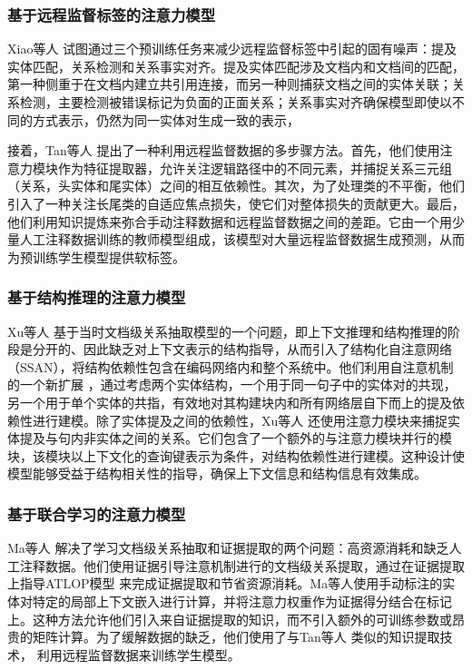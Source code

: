 \documentclass[bachelor]{thesis-uestc}
\begin{document}
\subsubsection{基于远程监督标签的注意力模型}

Xiao等人 \cite{xiao-etal-2020-denoising} 试图通过三个预训练任务来减少远程监督标签中引起的固有噪声：提及实体匹配，关系检测和关系事实对齐。提及实体匹配涉及文档内和文档间的匹配，第一种侧重于在文档内建立共引用连接，而另一种则捕获文档之间的实体关联；关系检测，主要检测被错误标记为负面的正面关系；关系事实对齐确保模型即使以不同的方式表示，仍然为同一实体对生成一致的表示， \par

接着，Tan等人 \cite{tan-etal-2022-document} 提出了一种利用远程监督数据的多步骤方法。首先，他们使用注意力模块作为特征提取器，允许关注逻辑路径中的不同元素，并捕捉关系三元组（关系，头实体和尾实体）之间的相互依赖性。其次，为了处理类的不平衡，他们引入了一种关注长尾类的自适应焦点损失，使它们对整体损失的贡献更大。最后，他们利用知识提炼来弥合手动注释数据和远程监督数据之间的差距。它由一个用少量人工注释数据训练的教师模型组成，该模型对大量远程监督数据生成预测，从而为预训练学生模型提供软标签。

\subsubsection{基于结构推理的注意力模型}

Xu等人 \cite{Xu_Wang_Lyu_Zhu_Mao_2021} 基于当时文档级关系抽取模型的一个问题，即上下文推理和结构推理的阶段是分开的、因此缺乏对上下文表示的结构指导，从而引入了结构化自注意网络（SSAN），将结构依赖性包含在编码网络内和整个系统中。他们利用自注意机制的一个新扩展 \cite{Vaswani2017AttentionIA}，通过考虑两个实体结构，一个用于同一句子中的实体对的共现，另一个用于单个实体的共指，有效地对其构建块内和所有网络层自下而上的提及依赖性进行建模。除了实体提及之间的依赖性，Xu等人 \cite{Xu_Wang_Lyu_Zhu_Mao_2021}还使用注意力模块来捕捉实体提及与句内非实体之间的关系。它们包含了一个额外的与注意力模块并行的模块，该模块以上下文化的查询键表示为条件，对结构依赖性进行建模。这种设计使模型能够受益于结构相关性的指导，确保上下文信息和结构信息有效集成。

\subsubsection{基于联合学习的注意力模型}
Ma等人 \cite{ma-etal-2023-dreeam} 解决了学习文档级关系抽取和证据提取的两个问题：高资源消耗和缺乏人工注释数据。他们使用证据引导注意机制进行的文档级关系提取，通过在证据提取上指导ATLOP模型 \cite{zhou2021document}来完成证据提取和节省资源消耗。Ma等人使用手动标注的实体对特定的局部上下文嵌入进行计算，并将注意力权重作为证据得分结合在标记上。这种方法允许他们引入来自证据提取的知识，而不引入额外的可训练参数或昂贵的矩阵计算。为了缓解数据的缺乏，他们使用了与Tan等人 \cite{tan-etal-2022-document} 类似的知识提取技术， 利用远程监督数据来训练学生模型。
\end{document}

